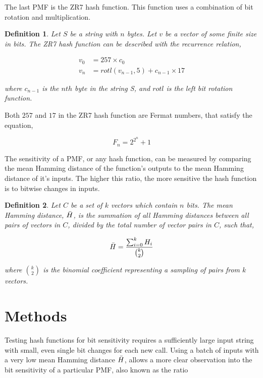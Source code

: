 \documentclass{article}
\newtheorem{definition}{Definition}[subsection]
\begin{document}
The last PMF is the ZR7 hash function. This function uses a combination of bit rotation and multiplication.

\begin{definition}
Let $S$ be a string with $n$ bytes. Let $v$ be a vector of some finite size in bits. The ZR7 hash function can be described with the recurrence relation,

\begin{align*}
    v_0 &= 257 \times c_0 \\
    v_n &= rotl(v_{n-1}, 5) + c_{n-1} \times 17
\end{align*}

where $c_{n-1}$ is the $nth$ byte in the string S, and $rotl$ is the left bit rotation function. 

\end{definition}

Both $257$ and $17$ in the ZR7 hash function are Fermat numbers\citep{robinson1954mersenne}, that satisfy the equation,

$$
    F_n = 2^{2^n} + 1
$$

The sensitivity of a PMF, or any hash function, can be measured by comparing the mean Hamming distance of the function's outputs to the mean Hamming distance of it's inputs. The higher this ratio, the more sensitive the hash function is to bitwise changes in inputs. 

\begin{definition}
Let $C$ be a set of $k$ vectors which contain $n$ bits. The mean Hamming distance, $\Bar{H}$, is the summation of all Hamming distances between all pairs of vectors in $C$, divided by the total number of vector pairs in $C$, such that,

$$
   \Bar{H} = \frac{\sum^{k}_{i=0} H_i }{\binom{k}{2}}
$$

where $\binom{k}{2}$ is the binomial coefficient representing a sampling of pairs from $k$ vectors.
\end{definition}

\section{Methods}

Testing hash functions for bit sensitivity requires a sufficiently large input string with small, even single bit changes for each new call. Using a batch of inputs with a very low mean Hamming distance $\Bar{H}$, allows a more clear observation into the bit sensitivity of a particular PMF, also known as the ratio 
\end{document}
